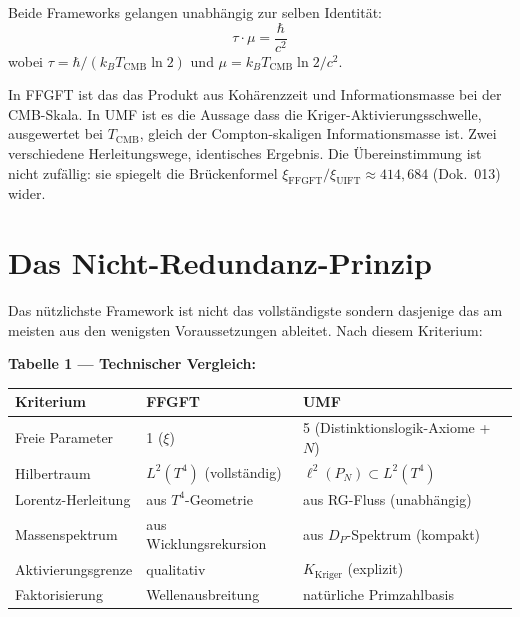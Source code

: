 Beide Frameworks gelangen unabhängig zur selben Identität:
\begin{equation}
  \tau \cdot \mu = \frac{\hbar}{c^2}
  \tag{244.7}
\end{equation}
wobei $\tau = \hbar/(k_B T_\text{CMB}\ln 2)$ und $\mu = k_B T_\text{CMB}\ln 2/c^2$.

In FFGFT ist das das Produkt aus Kohärenzzeit und Informationsmasse bei der
CMB-Skala. In UMF ist es die Aussage dass die Kriger-Aktivierungsschwelle,
ausgewertet bei $T_\text{CMB}$, gleich der Compton-skaligen Informationsmasse
ist. Zwei verschiedene Herleitungswege, identisches Ergebnis. Die
Übereinstimmung ist nicht zufällig: sie spiegelt die Brückenformel
$\xi_\text{FFGFT}/\xi_\text{UIFT} \approx 414{,}684$ (Dok.~013) wider.

\section{Das Nicht-Redundanz-Prinzip}

Das nützlichste Framework ist nicht das vollständigste sondern dasjenige das
am meisten aus den wenigsten Voraussetzungen ableitet. Nach diesem Kriterium:

\textbf{Tabelle 1 — Technischer Vergleich:}

\begin{center}
\renewcommand{\arraystretch}{1.4}
{\small
\begin{tabular}{p{4cm}p{4cm}p{4cm}}
\toprule
\textbf{Kriterium} & \textbf{FFGFT} & \textbf{UMF} \\
\midrule
Freie Parameter & 1 ($\xi$) & 5 (Distinktionslogik-Axiome + $N$) \\
Hilbertraum & $L^2(T^4)$ (vollständig) & $\ell^2(P_N) \subset L^2(T^4)$ \\
Lorentz-Herleitung & aus $T^4$-Geometrie & aus RG-Fluss (unabhängig) \\
Massenspektrum & aus Wicklungsrekursion & aus $D_P$-Spektrum (kompakt) \\
Aktivierungsgrenze & qualitativ & $K_\text{Kriger}$ (explizit) \\
Faktorisierung & Wellenausbreitung & natürliche Primzahlbasis \\
\bottomrule
\end{tabular}
}
\end{center}

